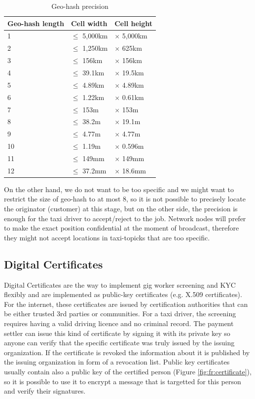 \documentclass{article}
\begin{document}
\begin{table}
	\centering
	\begin{tabular}{lll}
		\toprule
		Geo-hash length & Cell width & Cell height \\
		\midrule
		1  & $\le$ 5,000km & $\times$ 5,000km \\
		2  & $\le$ 1,250km & $\times$ 625km   \\
		3  & $\le$ 156km   & $\times$ 156km   \\
		4  & $\le$ 39.1km  & $\times$ 19.5km  \\
		5  & $\le$ 4.89km  & $\times$ 4.89km  \\
		6  & $\le$ 1.22km  & $\times$ 0.61km  \\
		7  & $\le$ 153m    & $\times$ 153m    \\
		8  & $\le$ 38.2m   & $\times$ 19.1m   \\
		9  & $\le$ 4.77m   & $\times$ 4.77m   \\
		10 & $\le$ 1.19m   & $\times$ 0.596m  \\
		11 & $\le$ 149mm   & $\times$ 149mm   \\
		12 & $\le$ 37.2mm  & $\times$ 18.6mm  \\
		\bottomrule
	\end{tabular}
	\caption{Geo-hash precision}
	\label{tab:geoprec}
\end{table}

On the other hand, we do not want to be too specific and we might want to restrict the size of geo-hash to at most 8, so it is not possible to precisely locate the originator (customer) at this stage, but on the other side, the precision is enough for the taxi driver to accept/reject to the job.
Network nodes will prefer to make the exact position confidential at the moment of broadcast, therefore they might not accept locations in taxi-topicks that are too specific.

\subsection{Digital Certificates}
Digital Certificates are the way to implement gig worker screening and KYC flexibly and are implemented as public-key certificates (e.g. X.509 certificates). For the internet, these certificates are issued by certification authorities that can be either trusted 3rd parties or communities. For a taxi driver, the screening requires having a valid driving licence and no criminal record. The payment settler can issue this kind of certificate by signing it with its private key so anyone can verify that the specific certificate was truly issued by the issuing organization. If the certificate is revoked the information about it is published by the issuing organization in form of a revocation list. Public key certificates usually contain also a public key of the certified person (Figure \ref{fig:fr:certificate}), so it is possible to use it to encrypt a message that is targetted for this person and verify their signatures.
\end{document}
